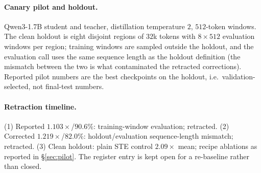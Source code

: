 \paragraph{Canary pilot and holdout.}
Qwen3-1.7B student and teacher, distillation temperature $2$, $512$-token
windows. The clean holdout is eight disjoint regions of $32$k tokens with
$8\times512$ evaluation windows per region; training windows are sampled
outside the holdout, and the evaluation call uses the same sequence length as
the holdout definition (the mismatch between the two is what contaminated the
retracted corrections). Reported pilot numbers are the best checkpoints on the
holdout, i.e.\ validation-selected, not final-test numbers.

\paragraph{Retraction timeline.}
(1) Reported $1.103\times$/$90.6\%$: training-window evaluation; retracted.
(2) Corrected $1.219\times$/$82.0\%$: holdout/evaluation sequence-length
mismatch; retracted. (3) Clean holdout: plain STE control $2.09\times$ mean;
recipe ablations as reported in \S\ref{sec:pilot}. The register entry
 is kept open for a re-baseline rather than closed.
